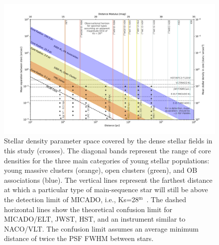 \documentclass[referee]{aa}
\newcommand{\m}{$^\mathrm{m}$~}
\begin{document}
\begin{figure}

    \centering
    \includegraphics[width=\textwidth]{resolved_stellar_densities.pdf}

    \caption{Stellar density parameter space covered by the dense stellar fields in this study (crosses).
    The diagonal bands represent the range of core densities for the three main categories of young stellar populations: young massive clusters (orange), open clusters (green), and OB associations (blue).
    The vertical lines represent the farthest distance at which a particular type of main-sequence star will still be above the detection limit of MICADO, i.e., Ks=28\m.
    The dashed horizontal lines show the theoretical confusion limit for MICADO/ELT, JWST, HST, and an instrument similar to NACO/VLT.
    The confusion limit assumes an average minimum distance of twice the PSF FWHM between stars.
    }

    \label{fig:resolved_stellar_densities}

\end{figure}
\end{document}
